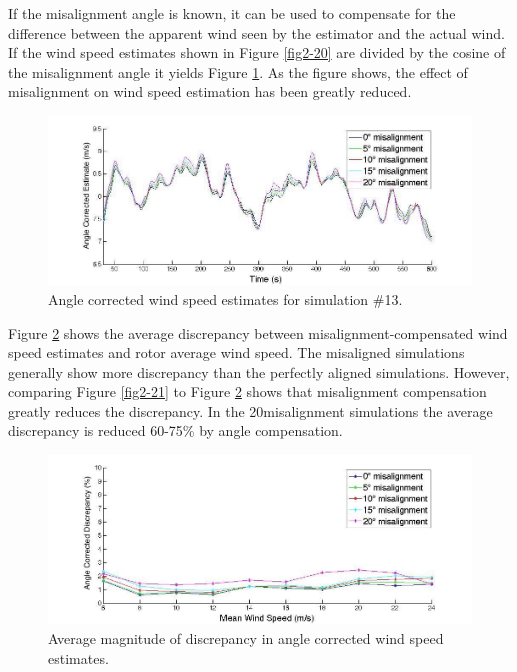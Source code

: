 If the misalignment angle is known, it can be used to compensate for the difference between the apparent wind seen by the estimator and the actual wind. If the wind speed estimates shown in Figure \ref{fig2-20} are divided by the cosine of the misalignment angle it yields Figure \ref{fig2-23}. As the figure shows, the effect of misalignment on wind speed estimation has been greatly reduced. 


\begin{figure}[htbp]
	\centering
	\includegraphics[width = \linewidth]{Figures/ch2Figures/fig2-23.jpg}
		
	\caption{Angle corrected wind speed estimates for simulation \#13.}
	\label{fig2-23}
\end{figure}


Figure \ref{fig2-24} shows the average discrepancy between misalignment-compensated wind speed estimates and rotor average wind speed. The misaligned simulations generally show more discrepancy than the perfectly aligned simulations. However, comparing Figure \ref{fig2-21} to Figure \ref{fig2-24} shows that misalignment compensation greatly reduces the discrepancy. In the 20\degree misalignment simulations the average discrepancy is reduced 60-75\% by angle compensation.


\begin{figure}[htbp]
	\centering
		\includegraphics[width = \linewidth]{Figures/ch2Figures/fig2-24.jpg}
		
	\caption{Average magnitude of discrepancy in angle corrected wind speed estimates.}
	\label{fig2-24}
\end{figure}


